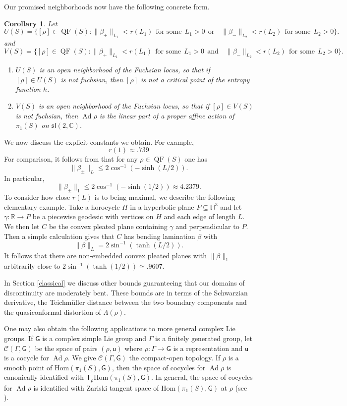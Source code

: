 \documentclass{amsart}
\theoremstyle{plain}
\newtheorem{corollary}[proposition]{Corollary}
\theoremstyle{definition}
\theoremstyle{remark}
\newcommand{\R}{\mathbb R}
\newcommand{\Hs}{{{\mathbb H}^3}}
\newcommand{\Ad}{\operatorname{Ad}}
\newcommand{\QF}{\operatorname{QF}}
\renewcommand{\sf}[1]{{\mathsf{#1}}}
\newcommand{\C}{\mathbb C}
\renewcommand{\sl}{\mathfrak{sl}}
\newcommand{\<}{\left <}
\renewcommand{\>}{\right >}
\newcommand{\G}{\Gamma}
\newcommand{\co}{\sf u}
\renewcommand{\C}{\mathbb C}
\newcommand{\Hom}{\mathrm{Hom}}
\begin{document}
Our promised neighborhoods now have the following concrete form.

\begin{corollary}
\label{neighborhoods}
Let 
$$U(S)=\{[\rho]\in \QF(S): \|\beta_+\|_{L_1}<r(L_1)\ \ \text{for some}\ \ L_1>0\ \ \text{or}\quad  \|\beta_-\|_{L_2}<r(L_2)\ \ \text{for some}\ \ L_2>0\}.$$
and
$$V(S)=\{[\rho]\in \QF(S): \|\beta_+\|_{L_1}<r(L_1)\ \ \text{for some}\ \ L_1>0\ \ \text{and}\quad  \|\beta_-\|_{L_2}<r(L_2)\ \ \text{for some}\ \ L_2>0\}.$$
\begin{enumerate}
\item
$U(S)$ is an open neighborhood of the Fuchsian locus, so that if $[\rho]\in U(S)$ is not fuchsian, then $[\rho]$ is not a critical point
of the entropy function $h$.
\item
$V(S)$ is an open neighborhood of the Fuchsian locus, so that if $[\rho]\in V(S)$ is not fuchsian, then $\Ad\rho$ is the linear part
of a proper affine action of $\pi_1(S)$ on $\sl(2,\C)$.
\end{enumerate}
\end{corollary}

We now discuss the explicit constants we obtain. 
For example, 
$$r(1) \approx .739$$
For comparison, it follows from \cite[Thm. 4.1]{BCY} that for any $\rho\in \QF(S)$ one has
$$\|\beta_\pm\|_L\le 2\cos^{-1}\left(-\sinh(L/2)\right).$$
In particular,
$$\|\beta_\pm\|_1\le 2\cos^{-1}(-\sinh(1/2))\approx 4.2379.$$
To consider how close $r(L)$ is to being maximal, we describe the following elementary example. 
Take a horocycle $H$ in a hyperbolic plane $P \subseteq \Hs$ and let $\gamma:\R\rightarrow P$ be a piecewise geodesic with vertices on $H$ 
and each edge of length $L$. We then let $C$ be the convex pleated plane containing $\gamma$ and perpendicular to $P$. 
Then a simple calculation gives that $C$ has bending lamination $\beta$ with 
$$\|\beta\|_L = 2\sin^{-1}\left(\tanh(L/2)\right).$$
It follows that  there are non-embedded convex pleated planes with
$ \|\beta\|_1$ arbitrarily close to   $2\sin^{-1}\left(\tanh(1/2)\right)\simeq .9607.$

In Section \ref{classical} we discuss other bounds guaranteeing that our domains of discontinuity are moderately bent.
These bounds are in terms of the Schwarzian derivative, the Teichm\"uller distance between the two boundary components
and the quasiconformal distortion of $\Lambda(\rho)$.



\medskip

One may also obtain the following applications to more general complex Lie groups. If $\sf G$ is a complex simple Lie group and $\Gamma$ is a finitely generated group,
let $\mathcal C(\G,\sf G)$ be the space of pairs $(\rho,\co)$ where $\rho:\Gamma\to \sf G$ is a representation and $\co$ is a cocycle for $\Ad\rho$. 
We give $\mathcal C(\G,\sf G)$
the compact-open topology.
If $\rho$ is a smooth point of $\Hom(\pi_1(S),\sf G)$, then the space of cocycles for $\Ad\rho$ is canonically identified with $ \sf T_\rho\Hom(\pi_1(S),\sf G)$. In general,
the space of cocycles for $\Ad\rho$ is identified with 
Zariski tangent space of $\Hom(\pi_1(S),\sf G)$ at $\rho$ (see \cite{goldman-symplectic}).
\end{document}

